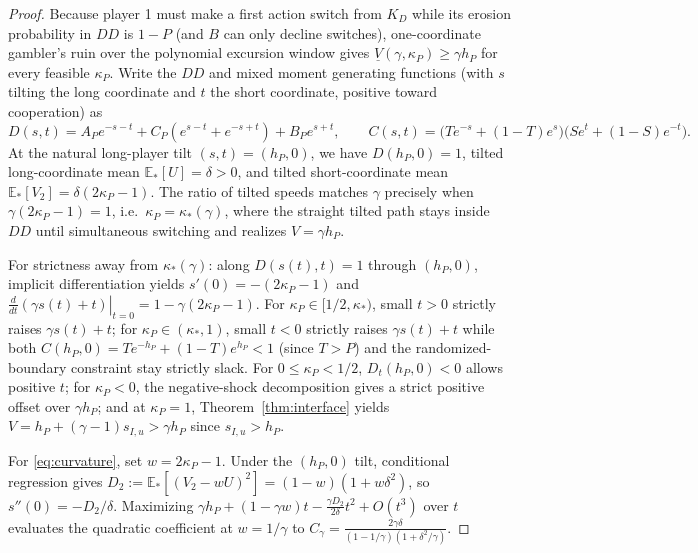 \documentclass[11pt,reqno]{amsart}
\theoremstyle{definition}
\theoremstyle{remark}
\newcommand{\E}{\mathbb{E}}
\begin{document}
\begin{proof}
Because player 1 must make a first action switch from $K_D$ while its erosion probability in $DD$ is $1-P$ (and $B$ can only decline switches), one-coordinate gambler's ruin over the polynomial excursion window gives $\underline{V}(\gamma,\kappa_P) \ge \gamma h_P$ for every feasible $\kappa_P$. Write the $DD$ and mixed moment generating functions (with $s$ tilting the long coordinate and $t$ the short coordinate, positive toward cooperation) as
\begin{equation}\label{eq:MGF-DC}
  D(s,t) = A_P e^{-s-t} + C_P(e^{s-t} + e^{-s+t}) + B_P e^{s+t}, \qquad
  C(s,t) = \bigl(T e^{-s} + (1-T)e^s\bigr)\bigl(S e^t + (1-S)e^{-t}\bigr).
\end{equation}
At the natural long-player tilt $(s,t) = (h_P, 0)$, we have $D(h_P,0) = 1$, tilted long-coordinate mean $\E_*[U] = \delta > 0$, and tilted short-coordinate mean $\E_*[V_2] = \delta(2\kappa_P - 1)$. The ratio of tilted speeds matches $\gamma$ precisely when $\gamma(2\kappa_P - 1) = 1$, i.e.\ $\kappa_P = \kappa_*(\gamma)$, where the straight tilted path stays inside $DD$ until simultaneous switching and realizes $V = \gamma h_P$.

For strictness away from $\kappa_*(\gamma)$: along $D(s(t), t) = 1$ through $(h_P, 0)$, implicit differentiation yields $s'(0) = -(2\kappa_P - 1)$ and $\left.\frac{d}{dt}(\gamma s(t) + t)\right|_{t=0} = 1 - \gamma(2\kappa_P - 1)$. For $\kappa_P \in [1/2, \kappa_*)$, small $t > 0$ strictly raises $\gamma s(t) + t$; for $\kappa_P \in (\kappa_*, 1)$, small $t < 0$ strictly raises $\gamma s(t) + t$ while both $C(h_P,0) = T e^{-h_P} + (1-T)e^{h_P} < 1$ (since $T > P$) and the randomized-boundary constraint stay strictly slack. For $0 \le \kappa_P < 1/2$, $D_t(h_P,0) < 0$ allows positive $t$; for $\kappa_P < 0$, the negative-shock decomposition gives a strict positive offset over $\gamma h_P$; and at $\kappa_P = 1$, Theorem~\ref{thm:interface} yields $V = h_P + (\gamma - 1)s_{I,u} > \gamma h_P$ since $s_{I,u} > h_P$.

For \eqref{eq:curvature}, set $w = 2\kappa_P - 1$. Under the $(h_P,0)$ tilt, conditional regression gives $D_2 := \E_*[(V_2 - w U)^2] = (1-w)(1 + w\delta^2)$, so $s''(0) = -D_2/\delta$. Maximizing $\gamma h_P + (1-\gamma w)t - \frac{\gamma D_2}{2\delta} t^2 + O(t^3)$ over $t$ evaluates the quadratic coefficient at $w = 1/\gamma$ to $C_\gamma = \frac{2\gamma\delta}{(1-1/\gamma)(1+\delta^2/\gamma)}$.
\end{proof}
\end{document}
